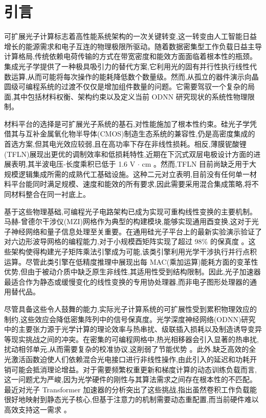 \section{引言}\label{ux5f15ux8a00}

可扩展光子计算标志着高性能系统架构的一次关键转变,这一转变由人工智能日益增长的能源需求和电子互连的物理极限所驱动。随着数据密集型工作负载日益主导计算格局,传统依赖电荷传输的方式在带宽密度和能效方面面临着根本性的瓶颈。集成光子学提供了一种极具吸引力的替代方案,它利用光的固有并行性执行线性代数运算,从而可能将每次操作的能耗降低数个数量级。然而,从孤立的器件演示向晶圆级可编程系统的过渡不仅仅是增加组件数量的问题。它需要驾驭一个复杂的局面,其中包括材料权衡、架构约束以及定义当前 ODNN 研究现状的系统性物理限制。

材料平台的选择是可扩展光子系统的基石,对性能施加了根本性约束。硅光子学凭借其与互补金属氧化物半导体(CMOS)制造生态系统的兼容性,仍是高密度集成的首选方案,但其电光效应较弱,且在高功率下存在非线性损耗。相反,薄膜铌酸锂(TFLN)展现出更优的调制效率和低损耗特性,近期在下沉式双层电极设计方面的进展表明,其半波电压-长度乘积已低于 1.6 V \(\cdot\) cm \citep{doi_10_3390_photonics12111129_03f4b6cd}。然而,TFLN 目前尚缺乏用于大规模逻辑集成所需的成熟代工基础设施。这种二元对立表明,目前没有任何单一材料平台能同时满足规模、速度和能效的所有要求,因此需要采用混合集成策略,将不同材料整合在同一衬底上。

基于这些物理基础,可编程光子电路架构已成为实现可重构线性变换的主要机制。马赫-曾德尔干涉仪(MZI)网格作为典型的构建模块,能够实现通用酉变换,这对于光子神经网络和量子信息处理至关重要。在通用硅光子平台上的最新实验演示验证了对六边形波导网格的编程能力,对于小规模酉矩阵实现了超过 98\% 的保真度 \citep{doi_10_1063_5_0235712_fb28986d}。这些架构使得构建光子矩阵乘法引擎成为可能,该类引擎利用光学干涉执行并行点积运算。尽管此类引擎在低精度推理中展现出每 MAC(乘加运算)能耗方面的变革性优势,但由于被动介质中缺乏原生非线性,其适用性受到结构限制。因此,光子加速器最适合作为静态或缓慢变化的线性变换的专用协处理器,而非电子图形处理器的通用替代品。

尽管具备这些令人鼓舞的能力,实际光子计算系统的可扩展性受到累积物理效应的制约,这些效应会降低密集阵列中的信号保真度。光学深度神经网络(ODNN)研究中的主要张力源于光学计算的理论效率与热串扰、级联插入损耗以及制造诱导变异等现实挑战之间的冲突。在密集的可编程网格中,热光相移器会引入显著的热串扰,扰动相邻单元,从而需要复杂的校准协议,这削弱了节能优势 \citep{doi_10_1109_access_2020_3013116_8fec1fb2}。此外,缺乏高效的全光激活函数迫使人们依赖混合光电接口进行非线性操作,由此引入的延迟和功耗开销可能会抵消理论增益。对于需要频繁权重更新和梯度计算的动态训练负载而言,这一问题尤为严峻,因为光学硬件的刚性与其算法需求之间存在根本性的不匹配。最近对光子 Transformer 加速器的分析突出了这些挑战,指出虽然卷积工作负载能很好地映射到静态光子核心,但基于注意力的机制需要动态重配置,而当前硬件难以高效支持这一需求 \citep{doi_10_1109_hpca57654_2024_00059_f488ee7a}。

